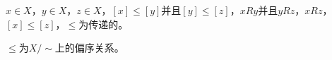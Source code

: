 \documentclass{beamer}
\begin{document}
\begin{CJK*}{UTF8}{gbsn}
\begin{frame}
  $x\in X$，\pause$y\in X$，\pause$z\in X$，$[x] \leq [y]$并且$[y] \leq [z]$，$xRy$并且$yRz$，$xRz$，$[x]\leq [z]$，$\leq$为传递的。

  $\leq$为$X/\sim$上的偏序关系。

\end{frame}


   


\end{CJK*}
\end{document}
